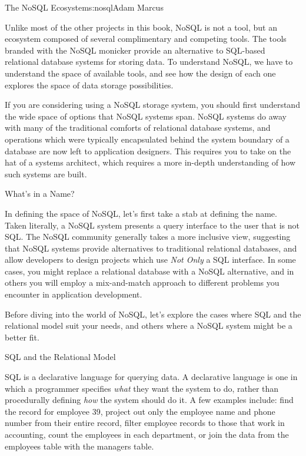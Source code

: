 \begin{aosachapter}{The NoSQL Ecosystem}{s:nosql}{Adam Marcus}

Unlike most of the other projects in this book, NoSQL is not a tool, but
an ecosystem composed of several complimentary and competing tools.
The tools branded with the NoSQL monicker provide an alternative to
SQL-based relational database systems for storing data. To understand
NoSQL, we have to understand the space of available tools, and see how
the design of each one explores the space of data storage possibilities.

If you are considering using a NoSQL storage system, you should first
understand the wide space of options that NoSQL systems span.  NoSQL
systems do away with many of the traditional comforts of relational
database systems, and operations which were typically encapsulated
behind the system boundary of a database are now left to application
designers.  This requires you to take on the hat of a systems
architect, which requires a more in-depth understanding of how such
systems are built.

\begin{aosasect1}{What's in a Name?}

In defining the space of NoSQL, let's first take a stab at defining
the name.  Taken literally, a NoSQL system presents a query interface
to the user that is not SQL\@.  The NoSQL community generally takes a
more inclusive view, suggesting that NoSQL systems provide
alternatives to traditional relational databases, and allow developers
to design projects which use \emph{Not Only} a SQL interface. In some
cases, you might replace a relational database with a NoSQL
alternative, and in others you will employ a mix-and-match approach to
different problems you encounter in application development.

Before diving into the world of NoSQL, let's explore the cases where
SQL and the relational model suit your needs, and others where a NoSQL
system might be a better fit.

\begin{aosasect2}{SQL and the Relational Model}

SQL is a declarative language for querying data.  A declarative
language is one in which a programmer specifies \emph{what} they want
the system to do, rather than procedurally defining \emph{how} the
system should do it.  A few examples include: find the record for
employee 39, project out only the employee name and phone number from
their entire record, filter employee records to those that work in
accounting, count the employees in each department, or join the data
from the employees table with the managers table.


\end{aosasect2}
\end{aosasect1}
\end{aosachapter}
